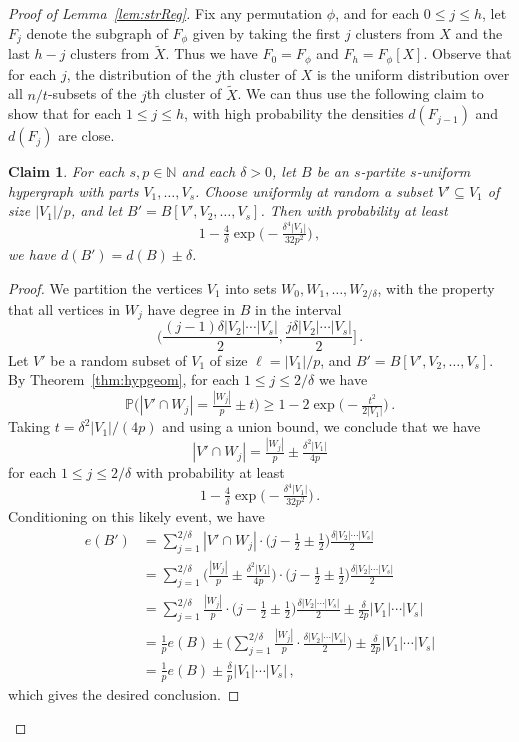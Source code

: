 \documentclass[12pt,a4paper]{amsart}
\newtheorem{claim}[theorem] {Claim}
\newcommand{\oldqed}{}
\def\endofClaim{\hfill\scalebox{.6}{$\Box$}}
\newenvironment{claimproof}[1][Proof]{
  \renewcommand{\oldqed}{\qedsymbol}
  \renewcommand{\qedsymbol}{\endofClaim}
  \begin{proof}[#1]
}{
  \end{proof}
  \renewcommand{\qedsymbol}{\oldqed}
}
\newcommand{\Prob}{\mathbb{P}}
\newcommand{\NATS}{\mathbb{N}}
\begin{document}
\begin{proof}[Proof of Lemma~\ref{lem:strReg}]
Fix any permutation $\phi$, and for each $0\le j\le h$, let $F_j$ denote the subgraph of $F_\phi$ given by taking the first $j$ clusters from $X$ and the last $h-j$ clusters from $\tilde{X}$. Thus we have $F_0=F_\phi$ and $F_{h}=F_\phi[X]$. Observe that for each $j$, the distribution of the $j$th cluster of $X$ is the uniform distribution over all $n/t$-subsets of the $j$th cluster of $\tilde{X}$. We can thus use the following claim to show that for each $1\le j\le h$, with high probability the densities $d(F_{j-1})$ and $d(F_j)$ are close.

\begin{claim}\label{clm:equipart}
  For each $s,p\in\NATS$ and each $\delta>0$, let $B$ be an
  $s$-partite $s$-uniform hypergraph with parts $V_1,\ldots,V_s$. Choose uniformly at random a subset $V' \subseteq V_1$ of size $|V_1|/p$, and let $B'=B[V',V_2,\ldots,V_s]$. Then with
  probability at least \[1- \tfrac{4}{\delta}\exp\big(-\tfrac{\delta^4|V_1|}{32p^2}\big)\,,\] we have $d(B')=d(B)\pm\delta$.
\end{claim}
\begin{claimproof}
  We partition the vertices $V_1$ into sets $W_0, W_1,\ldots,W_{2/\delta}$, with the
  property that all vertices in $W_j$ have degree in $B$ in the interval
  \[\Big(\frac{(j-1)\delta |V_2|\cdots|V_s|}{2},\frac{j\delta
    |V_2|\cdots|V_s|}{2}\Big]\,.\] Let $V'$ be a random subset of $V_1$ of
  size $\ell=|V_1|/p$, and $B'=B[V',V_2,\ldots,V_s]$. By
  Theorem~\ref{thm:hypgeom}, for each $1\le j\le 2/\delta$ we have
  \[\Prob\big(|V'\cap W_j|=\tfrac{|W_j|}{p}\pm t\big)\ge 1-2\exp\big(-\tfrac{t^2}{2|V_1|}\big)\,.\]
  Taking $t=\delta^2|V_1|/(4p)$ and using a union bound, we conclude that we have
  \[|V'\cap W_j|=\tfrac{|W_j|}{p}\pm\tfrac{\delta^2
  |V_1|}{4p}\]
  for each $1\le j\le 2/\delta$ with probability at least
  \[1- \tfrac{4}{\delta}\exp\big(-\tfrac{\delta^4|V_1|}{32p^2}\big)\,.\]
  Conditioning on this likely event, we have
  \begin{align*}
   e(B')&=\sum_{j=1}^{2/\delta}|V'\cap W_j|\cdot\big(j-\tfrac12\pm\tfrac12\big)\tfrac{\delta|V_2|\cdots|V_s|}{2}\\
   &=\sum_{j=1}^{2/\delta}\Big(\tfrac{|W_j|}{p}\pm\tfrac{\delta^2
   |V_1|}{4p}\Big)\cdot\big(j-\tfrac12\pm\tfrac12\big)\tfrac{\delta|V_2|\cdots|V_s|}{2}\\
   &=\sum_{j=1}^{2/\delta}\tfrac{|W_j|}{p}\cdot\big(j-\tfrac12\pm\tfrac12\big)\tfrac{\delta|V_2|\cdots|V_s|}{2}\pm\tfrac{\delta}{2p}|V_1|\cdots|V_s|\\
   &=\tfrac{1}{p}e(B)\pm\Big( \sum_{j=1}^{2/\delta}\tfrac{|W_j|}{p}\cdot\tfrac{\delta|V_2|\cdots|V_s|}{2}\Big)\pm\tfrac{\delta}{2p}|V_1|\cdots|V_s|\\
   &=\tfrac{1}{p}e(B)\pm\tfrac{\delta}{p}|V_1|\cdots|V_s|\,,
  \end{align*}
  which gives the desired conclusion.    
\end{claimproof}


\end{proof}
\end{document}

